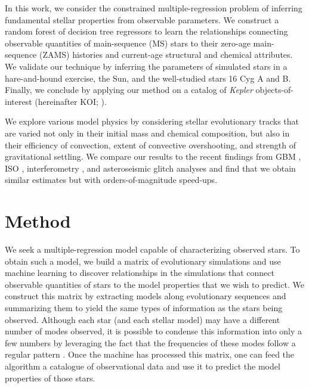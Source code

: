 \documentclass[twocolumn,twocolappendix]{aastex6}
\begin{document}
In this work, we consider the constrained multiple-regression problem of inferring fundamental stellar properties from observable parameters. We construct a random forest of decision tree regressors to learn the relationships connecting observable quantities of main-sequence (MS) stars to their zero-age main-sequence (ZAMS) histories and current-age structural and chemical attributes. We validate our technique by inferring the parameters of simulated stars in a hare-and-hound exercise, the Sun, and the well-studied stars 16 Cyg A and B. Finally, we conclude by applying our method on a catalog of \emph{Kepler} objects-of-interest (hereinafter KOI; \citealt{2016MNRAS.456.2183D}).  


We explore various model physics by considering stellar evolutionary tracks that are varied not only in their initial mass and chemical composition, but also in their efficiency of convection, extent of convective overshooting, and strength of gravitational settling. We compare our results to the recent findings from GBM \citep{2015MNRAS.452.2127S}, ISO \citep{2015ApJ...811L..37M}, interferometry \citep{2013MNRAS.433.1262W}, and asteroseismic glitch analyses \citep{2014ApJ...790..138V} and find that we obtain similar estimates but with orders-of-magnitude speed-ups. 


\section{Method} \label{sec:Method} 
We seek a multiple-regression model capable of characterizing observed stars. To obtain such a model, we build a matrix of evolutionary simulations and use machine learning to discover relationships in the simulations that connect observable quantities of stars to the model properties that we wish to predict. We construct this matrix by extracting models along evolutionary sequences and summarizing them to yield the same types of information as the stars being observed. Although each star (and each stellar model) may have a different number of modes observed, it is possible to condense this information into only a few numbers by leveraging the fact that the frequencies of these modes follow a regular pattern \citep[for a review of solar-like oscillations, see][]{doi:10.1146/annurev-astro-082812-140938}. Once the machine has processed this matrix, one can feed the algorithm a catalogue of observational data and use it to predict the model properties of those stars.
\end{document}
